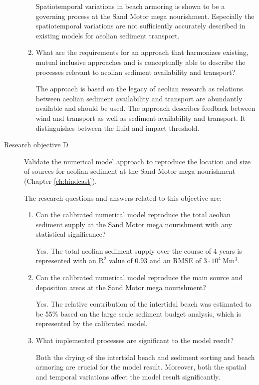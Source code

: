 \begin{description}
\begin{enumerate}[{C}1]
    Spatiotemporal variations in beach armoring is shown to be a
    governing process at the Sand Motor mega nourishment. Especially
    the spatiotemporal variations are not sufficiently accurately
    described in existing models for aeolian sediment transport.

  \item What are the requirements for an approach that harmonizes
    existing, mutual inclusive approaches and is conceptually able to
    describe the processes relevant to aeolian sediment availability
    and transport?

    The approach is based on the legacy of aeolian research as
    relations between aeolian sediment availability and transport are
    abundantly available and should be used. The approach describes
    feedback between wind and transport as well as sediment
    availability and transport. It distinguishes between the fluid and
    impact threshold.
  \end{enumerate}

\bigskip

\item[Research objective D] Validate the numerical model approach to
  reproduce the location and size of sources for aeolian sediment at
  the Sand Motor mega nourishment (Chapter \ref{ch:hindcast}).

  \medskip

  The research questions and answers related to this objective are:

  \begin{enumerate}[{D}1]
  \item Can the calibrated numerical model reproduce the total aeolian
    sediment supply at the Sand Motor mega nourishment with any
    statistical significance?

    Yes. The total aeolian sediment supply over the course of 4 years
    is represented with an $\mathrm{R^2}$ value of 0.93 and an RMSE of
    $3 \cdot 10^4 ~ \mathrm{Mm^3}$.

  \item Can the calibrated numerical model reproduce the main source
    and deposition areas at the Sand Motor mega nourishment?

    Yes. The relative contribution of the intertidal beach was
    estimated to be 55\% based on the large scale sediment budget
    analysis, which is represented by the calibrated model.

  \item What implemented processes are significant to the model
    result?

    Both the drying of the intertidal beach and sediment sorting and
    beach armoring are crucial for the model result. Moreover, both
    the spatial and temporal variations affect the model result
    significantly.
  \end{enumerate}
\end{description}

